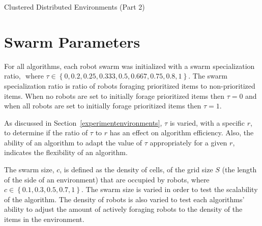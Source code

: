 \begin{algorithm}

\caption{Clustered Distributed Environments (Part 2)}
\label{algorithm:clustered2}
\begin{algorithmic}[1]
	  \State {}
	  \State {}
	  \State {}
	
		  \State {}
		  \State {}
		  \State {}
				
        	\State {}
        	\State {}
				  \State {}
				  \State {}	
			  \EndIf
		  \EndWhile
		\EndIf
	\EndWhile
\EndFunction
\end{algorithmic}
\end{algorithm}


\section{Swarm Parameters}
\label{swarmparameters}

For all algorithms, each robot swarm was initialized with 
a swarm specialization ratio, $
$ where $\tau\in\left\{0, 0.2, 0.25, 0.333, 0.5, 0.667, 0.75, 0.8,1\right\}$. The swarm specialization ratio is ratio of robots foraging prioritized items to non-prioritized items. When no robots are set to initially forage prioritized items then $\tau=0$ and when all robots are set to initially forage prioritized items then $\tau=1$.

As discussed in Section~\ref{experimentenvironments}, $\tau$ is varied, with a specific $r$, to determine if the ratio of $\tau$ to $r$ has an effect on algorithm efficiency. Also, the ability of an algorithm to adapt the value of $\tau$ appropriately for a given $r$, indicates the flexibility of an algorithm. %

The swarm size, $c$, is defined as the density of cells, of the grid size $S$ (the length of the side of an environment) that are occupied by robots, where $c\in\left\{0.1, 0.3, 0.5, 0.7, 1\right\}$. The swarm size is varied in order to test the scalability of the algorithm. The density of robots is also varied to test each algorithms' ability to adjust the amount of actively  foraging robots to the density of the items in the environment.

